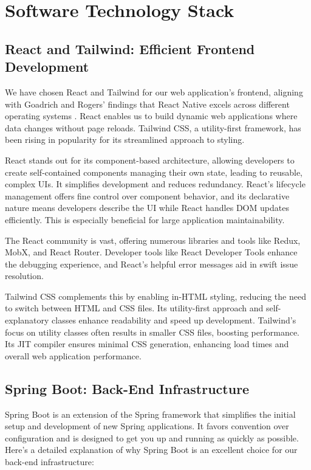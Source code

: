 \section{Software Technology Stack}
\label{sec:technology}

\subsection{React and Tailwind: Efficient Frontend Development}

We have chosen React and Tailwind for our web application's frontend, aligning with Goadrich and Rogers' findings that React Native excels across different operating systems \cite[p.~611]{goadrich2011smart}. React enables us to build dynamic web applications where data changes without page reloads. Tailwind CSS, a utility-first framework, has been rising in popularity for its streamlined approach to styling.

React stands out for its component-based architecture, allowing developers to create self-contained components managing their own state, leading to reusable, complex UIs. It simplifies development and reduces redundancy. React's lifecycle management offers fine control over component behavior, and its declarative nature means developers describe the UI while React handles DOM updates efficiently. This is especially beneficial for large application maintainability.

The React community is vast, offering numerous libraries and tools like Redux, MobX, and React Router. Developer tools like React Developer Tools enhance the debugging experience, and React's helpful error messages aid in swift issue resolution.

Tailwind CSS complements this by enabling in-HTML styling, reducing the need to switch between HTML and CSS files. Its utility-first approach and self-explanatory classes enhance readability and speed up development. Tailwind's focus on utility classes often results in smaller CSS files, boosting performance. Its JIT compiler ensures minimal CSS generation, enhancing load times and overall web application performance.

\subsection{Spring Boot: Back-End Infrastructure}
Spring Boot is an extension of the Spring framework that simplifies the initial setup and development of new Spring applications.\cite{springboot2023} 
It favors convention over configuration and is designed to get you up and running as quickly as possible. Here's a detailed explanation of why Spring Boot is an excellent choice for our back-end infrastructure:

